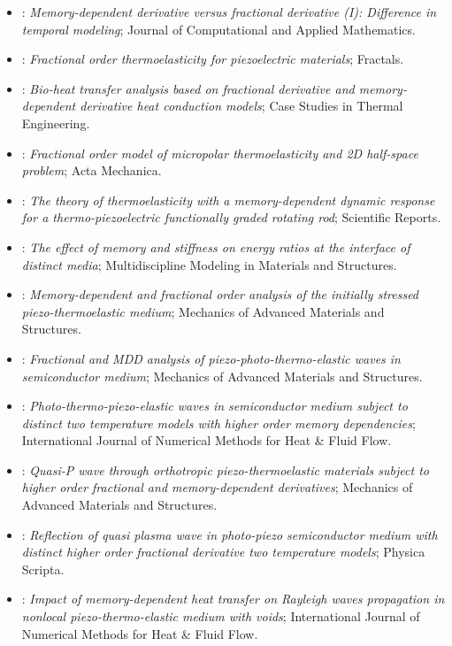 \begin{itemize}
\item \citet{Wang2021}: \emph{Memory-dependent derivative versus fractional derivative (I): Difference in temporal modeling}; Journal of Computational and Applied Mathematics.
\item \citet{Yu2021}: \emph{Fractional order thermoelasticity for piezoelectric materials}; Fractals.
\item \citet{Zhang2021}: \emph{Bio-heat transfer analysis based on fractional derivative and memory-dependent derivative heat conduction models}; Case Studies in Thermal Engineering.
\item \citet{Sharma2022}: \emph{Fractional order model of micropolar thermoelasticity and 2D half-space problem}; Acta Mechanica.
\item \citet{Abouelregal2023}: \emph{The theory of thermoelasticity with a memory-dependent dynamic response for a thermo-piezoelectric functionally graded rotating rod}; Scientific Reports.
\item \citet{Barak2023MMMS}: \emph{The effect of memory and stiffness on energy ratios at the interface of distinct media}; Multidiscipline Modeling in Materials and Structures.
\item \citet{Barak2023a}: \emph{Memory-dependent and fractional order analysis of the initially stressed piezo-thermoelastic medium}; Mechanics of Advanced Materials and Structures.
\item \citet{Gupta2023}: \emph{Fractional and MDD analysis of piezo-photo-thermo-elastic waves in semiconductor medium}; Mechanics of Advanced Materials and Structures.
\item \citet{Gupta2023a}: \emph{Photo-thermo-piezo-elastic waves in semiconductor medium subject to distinct two temperature models with higher order memory dependencies}; International Journal of Numerical Methods for Heat \& Fluid Flow.
\item \citet{Gupta2023b}: \emph{Quasi-P wave through orthotropic piezo-thermoelastic materials subject to higher order fractional and memory-dependent derivatives}; Mechanics of Advanced Materials and Structures.
\item \citet{Gupta2024a}: \emph{Reflection of quasi plasma wave in photo-piezo semiconductor medium with distinct higher order fractional derivative two temperature models}; Physica Scripta.
\item \citet{Gupta2024b}: \emph{Impact of memory-dependent heat transfer on Rayleigh waves propagation in nonlocal piezo-thermo-elastic medium with voids}; International Journal of Numerical Methods for Heat \& Fluid Flow.

\end{itemize}

